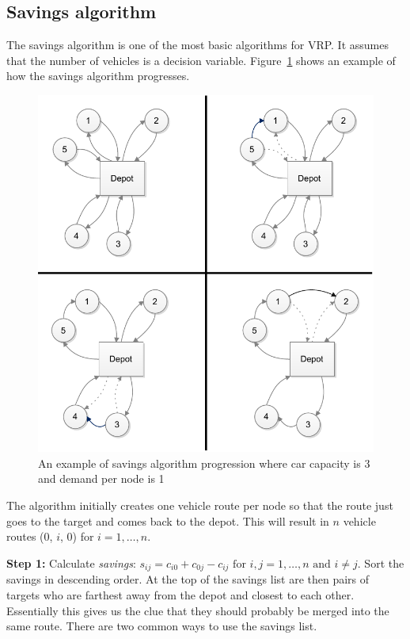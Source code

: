 \clearpage

\subsection{Savings algorithm}

The savings algorithm is one of the most basic algorithms for VRP. It assumes that the number of vehicles is a decision variable. Figure~\ref{fig:savings1} shows an example of how the savings algorithm progresses.

\begin{figure}[H]
  \begin{center}
    \includegraphics{images/Savings1.pdf}
    \caption{An example of savings algorithm progression where car capacity is 3 and demand per node is 1}
    \label{fig:savings1}
  \end{center}
\end{figure}

The algorithm initially creates one vehicle route per node so that the route just goes to the target and comes back to the depot. This will result in $n$ vehicle routes (0, $i$, 0) for $i = 1, \ldots, n$. \cite{reimann2004d}

\medskip
\noindent
\textbf{Step 1:} Calculate \textit{savings}: $s_{ij} = c_{i0} + c_{0j} - c_{ij} \text{ for } i, j = 1, \ldots, n \text{ and } i \neq j$. Sort the savings in descending order. \cite{reimann2004d} At the top of the savings list are then pairs of targets who are farthest away from the depot and closest to each other. Essentially this gives us the clue that they should probably be merged into the same route. There are two common ways to use the savings list.


